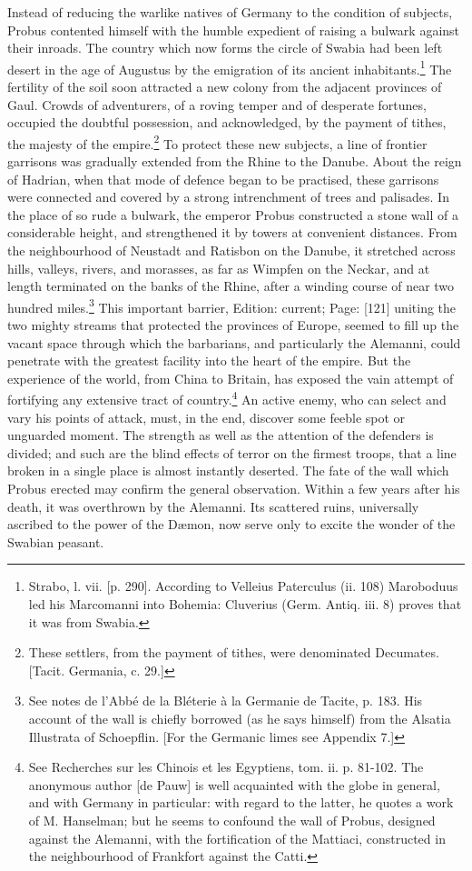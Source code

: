 Instead of reducing the warlike natives of Germany to the condition of subjects, Probus contented himself with the humble expedient of raising a bulwark against their inroads. The country which now forms the circle of Swabia had been left desert in the age of Augustus by the emigration of its ancient inhabitants.\footnote{Strabo, l. vii. [p. 290]. According to Velleius Paterculus (ii. 108) Maroboduus led his Marcomanni into Bohemia: Cluverius (Germ. Antiq. iii. 8) proves that it was from Swabia.} The fertility of the soil soon attracted a new colony from the adjacent provinces of Gaul. Crowds of adventurers, of a roving temper and of desperate fortunes, occupied the doubtful possession, and acknowledged, by the payment of tithes, the majesty of the empire.\footnote{These settlers, from the payment of tithes, were denominated Decumates. [Tacit. Germania, c. 29.]} To protect these new subjects, a line of frontier garrisons was gradually extended from the Rhine to the Danube. About the reign of Hadrian, when that mode of defence began to be practised, these garrisons were connected and covered by a strong intrenchment of trees and palisades. In the place of so rude a bulwark, the emperor Probus constructed a stone wall of a considerable height, and strengthened it by towers at convenient distances. From the neighbourhood of Neustadt and Ratisbon on the Danube, it stretched across hills, valleys, rivers, and morasses, as far as Wimpfen on the Neckar, and at length terminated on the banks of the Rhine, after a winding course of near two hundred miles.\footnote{See notes de l\texthebrew{}’Abbé de la Bléterie à la Germanie de Tacite, p. 183. His account of the wall is chiefly borrowed (as he says himself) from the Alsatia Illustrata of Schoepflin. [For the Germanic limes see Appendix 7.]} This important barrier, Edition: current; Page: [121] uniting the two mighty streams that protected the provinces of Europe, seemed to fill up the vacant space through which the barbarians, and particularly the Alemanni, could penetrate with the greatest facility into the heart of the empire. But the experience of the world, from China to Britain, has exposed the vain attempt of fortifying any extensive tract of country.\footnote{See Recherches sur les Chinois et les Egyptiens, tom. ii. p. 81-102. The anonymous author [de Pauw] is well acquainted with the globe in general, and with Germany in particular: with regard to the latter, he quotes a work of M. Hanselman; but he seems to confound the wall of Probus, designed against the Alemanni, with the fortification of the Mattiaci, constructed in the neighbourhood of Frankfort against the Catti.} An active enemy, who can select and vary his points of attack, must, in the end, discover some feeble spot or unguarded moment. The strength as well as the attention of the defenders is divided; and such are the blind effects of terror on the firmest troops, that a line broken in a single place is almost instantly deserted. The fate of the wall which Probus erected may confirm the general observation. Within a few years after his death, it was overthrown by the Alemanni. Its scattered ruins, universally ascribed to the power of the Dæmon, now serve only to excite the wonder of the Swabian peasant.

